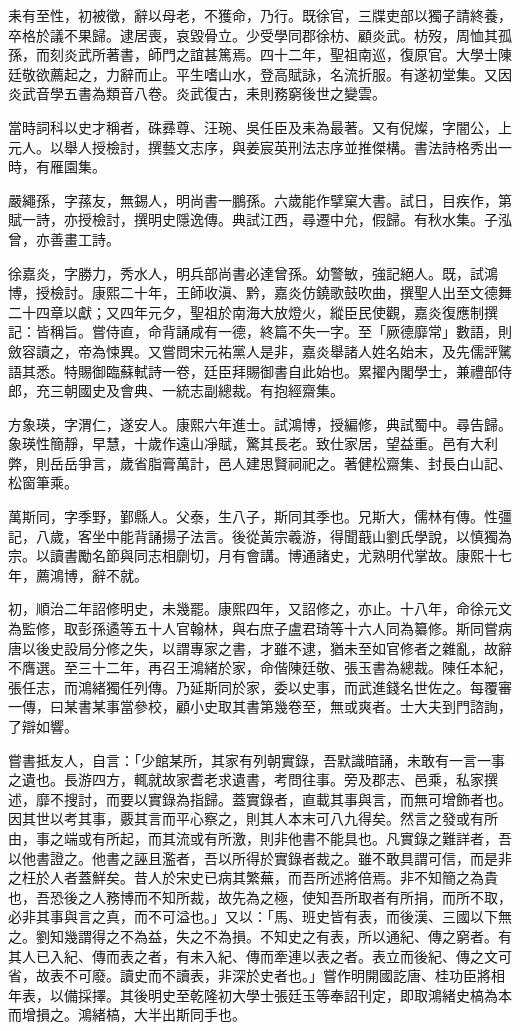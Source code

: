 \begin{pinyinscope}
耒有至性，初被徵，辭以母老，不獲命，乃行。既徐官，三牒吏部以獨子請終養，卒格於議不果歸。逮居喪，哀毀骨立。少受學同郡徐枋、顧炎武。枋歿，周恤其孤孫，而刻炎武所著書，師門之誼甚篤焉。四十二年，聖祖南巡，復原官。大學士陳廷敬欲薦起之，力辭而止。平生嗜山水，登高賦詠，名流折服。有遂初堂集。又因炎武音學五書為類音八卷。炎武復古，耒則務窮後世之變雲。

當時詞科以史才稱者，硃彞尊、汪琬、吳任臣及耒為最著。又有倪燦，字闇公，上元人。以舉人授檢討，撰藝文志序，與姜宸英刑法志序並推傑構。書法詩格秀出一時，有雁園集。

嚴繩孫，字蓀友，無錫人，明尚書一鵬孫。六歲能作擘窠大書。試日，目疾作，第賦一詩，亦授檢討，撰明史隱逸傳。典試江西，尋遷中允，假歸。有秋水集。子泓曾，亦善畫工詩。

徐嘉炎，字勝力，秀水人，明兵部尚書必達曾孫。幼警敏，強記絕人。既，試鴻博，授檢討。康熙二十年，王師收滇、黔，嘉炎仿鐃歌鼓吹曲，撰聖人出至文德舞二十四章以獻；又四年元夕，聖祖於南海大放燈火，縱臣民使觀，嘉炎復應制撰記：皆稱旨。嘗侍直，命背誦咸有一德，終篇不失一字。至「厥德靡常」數語，則斂容讀之，帝為悚異。又嘗問宋元祐黨人是非，嘉炎舉諸人姓名始末，及先儒評騭語其悉。特賜御臨蘇軾詩一卷，廷臣拜賜御書自此始也。累擢內閣學士，兼禮部侍郎，充三朝國史及會典、一統志副總裁。有抱經齋集。

方象瑛，字渭仁，遂安人。康熙六年進士。試鴻博，授編修，典試蜀中。尋告歸。象瑛性簡靜，早慧，十歲作遠山凈賦，驚其長老。致仕家居，望益重。邑有大利弊，則岳岳爭言，歲省脂膏萬計，邑人建思賢祠祀之。著健松齋集、封長白山記、松窗筆乘。

萬斯同，字季野，鄞縣人。父泰，生八子，斯同其季也。兄斯大，儒林有傳。性彊記，八歲，客坐中能背誦揚子法言。後從黃宗羲游，得聞蕺山劉氏學說，以慎獨為宗。以讀書勵名節與同志相劘切，月有會講。博通諸史，尤熟明代掌故。康熙十七年，薦鴻博，辭不就。

初，順治二年詔修明史，未幾罷。康熙四年，又詔修之，亦止。十八年，命徐元文為監修，取彭孫遹等五十人官翰林，與右庶子盧君琦等十六人同為纂修。斯同嘗病唐以後史設局分修之失，以謂專家之書，才雖不逮，猶未至如官修者之雜亂，故辭不膺選。至三十二年，再召王鴻緒於家，命偕陳廷敬、張玉書為總裁。陳任本紀，張任志，而鴻緒獨任列傳。乃延斯同於家，委以史事，而武進錢名世佐之。每覆審一傳，曰某書某事當參校，顧小史取其書第幾卷至，無或爽者。士大夫到門諮詢，了辯如響。

嘗書抵友人，自言：「少館某所，其家有列朝實錄，吾默識暗誦，未敢有一言一事之遺也。長游四方，輒就故家耆老求遺書，考問往事。旁及郡志、邑乘，私家撰述，靡不搜討，而要以實錄為指歸。蓋實錄者，直載其事與言，而無可增飾者也。因其世以考其事，覈其言而平心察之，則其人本末可八九得矣。然言之發或有所由，事之端或有所起，而其流或有所激，則非他書不能具也。凡實錄之難詳者，吾以他書證之。他書之誣且濫者，吾以所得於實錄者裁之。雖不敢具謂可信，而是非之枉於人者蓋鮮矣。昔人於宋史已病其繁蕪，而吾所述將倍焉。非不知簡之為貴也，吾恐後之人務博而不知所裁，故先為之極，使知吾所取者有所捐，而所不取，必非其事與言之真，而不可溢也。」又以：「馬、班史皆有表，而後漢、三國以下無之。劉知幾謂得之不為益，失之不為損。不知史之有表，所以通紀、傳之窮者。有其人已入紀、傳而表之者，有未入紀、傳而牽連以表之者。表立而後紀、傳之文可省，故表不可廢。讀史而不讀表，非深於史者也。」嘗作明開國訖唐、桂功臣將相年表，以備採擇。其後明史至乾隆初大學士張廷玉等奉詔刊定，即取鴻緒史槁為本而增損之。鴻緒槁，大半出斯同手也。


\end{pinyinscope}
